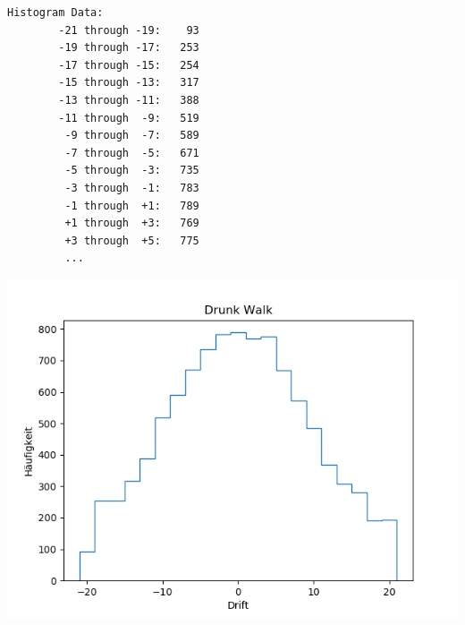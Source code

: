 \begin{frame}[fragile]
%
\begin{tcbraster}[raster columns=2,
                  raster equal height,
                  nobeforeafter,
                  raster column skip=0.5cm]
\begin{cmdbox}
\begin{verbatim}
Histogram Data:
        -21 through -19:    93
        -19 through -17:   253
        -17 through -15:   254
        -15 through -13:   317
        -13 through -11:   388
        -11 through  -9:   519
         -9 through  -7:   589
         -7 through  -5:   671
         -5 through  -3:   735
         -3 through  -1:   783
         -1 through  +1:   789
         +1 through  +3:   769
         +3 through  +5:   775
         ...
\end{verbatim}
\end{cmdbox}
%
\begin{tcolorbox}[title=Plot: Drunk Walk as Histogram]
	\includegraphics[width=\linewidth]{./gfx/plt-hist-drunkWalk}
\end{tcolorbox}
\end{tcbraster}
%
\end{frame}


